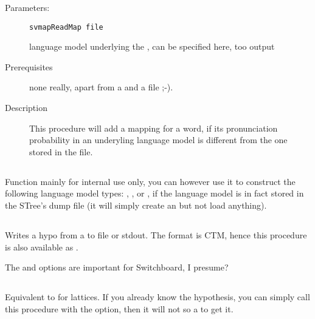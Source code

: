 \begin{description}

\item[Parameters:] \texttt{svmapReadMap file}

\begin{description}
 language
model underlying the , can be specified here, too
 output
\end{description}

\item[Prerequisites] none really, apart from a 
  and a file ;-).

\item[Description] This procedure will add a mapping for a word, if
its pronunciation probability in an underyling language model
is different from the one stored in the file.

\end{description}

\subsection{}

Function mainly for internal use only, you can however use it to
construct the following language model types: ,
,  or
, if the language model is in fact stored in the
STree's dump file (it will simply create an 
but not load anything).

\subsection{}

Writes a hypo from a  to file or stdout. The
format is CTM, hence this procedure is also 
available as .

The  and 
options are important for Switchboard, I presume?

\subsection{}

Equivalent to  for lattices. If you already
know the hypothesis, you can simply call this procedure with the
 option, then it will not so a
 to get it.

